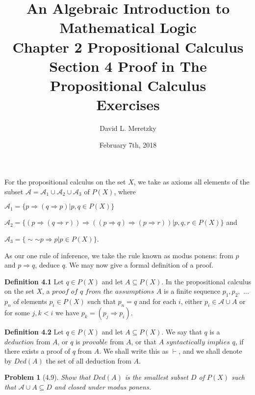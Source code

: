 \documentclass{article}
\title{ \vspace{-10ex} %
An Algebraic Introduction to Mathematical Logic\\
Chapter 2 Propositional Calculus \\
Section 4 Proof in The Propositional Calculus \\
Exercises 
}
\author{David L. Meretzky
}
\date{%
February 7th, 2018
}
\theoremstyle{problemstyle}
\newtheorem{problem}{Problem}
\begin{document}
\maketitle

\begin{flushleft}
For the propositional calculus on the set $X$, we take as axioms all elements of the subset $\mathscr{A} = \mathscr{A}_1 \cup \mathscr{A}_2 \cup \mathscr{A}_3$ 
of $P(X)$, where 
\end{flushleft}

\begin{flushleft}
$\mathscr{A}_1 = \{p \Rightarrow (q \Rightarrow p)|p,q \in P(X) \}$ 

$\mathscr{A}_2 = \{(p \Rightarrow (q \Rightarrow r)) \Rightarrow ((p \Rightarrow q)\Rightarrow (p \Rightarrow r))|p,q,r \in P(X) \}$ and 

$\mathscr{A}_3 = \{\sim$$\sim$$p\Rightarrow p|p \in P(X) \}$.
\end{flushleft}

\begin{flushleft}
As our one rule of inference, we take the rule known as modus ponens: from $p$ and $p\Rightarrow q$, deduce $q$. We may now give a formal definition of a proof. 
\end{flushleft}

\begin{flushleft}
\textbf{Definition 4.1}
Let $q \in P(X)$ and let $A \subseteq P(X)$. In the propositional calculus on the set $X$, a $\textit{proof of q from the assumptions A}$ is a finite sequence $p_1, p_2,$ ... $p_n$ of elements $p_i \in P(X)$ such that $p_n = q$ and for each $i$, either $p_i \in \mathscr{A} \cup A$ or for some $j,k < i$ we have $p_k = (p_j \Rightarrow p_i)$.
\end{flushleft}
\begin{flushleft}
\textbf{Definition 4.2}
Let $q \in P(X)$ and let $A \subseteq P(X)$. We say that $q$ is a $\textit{deduction}$ from $A$, or $q$ is $provable$ from $A$, or that $A$ $syntactically$ $implies$ $q$, if there exists a proof of $q$ from $A$. We shall write this as $\vdash$, and we shall denote by $Ded(A)$ the set of all deduction from $A$.  
\end{flushleft}

\begin{problem}[4.9] 
Show that $Ded(A)$ is the smallest subset $D$ of $P(X)$ such that $\mathscr{A} \cup A \subseteq D$ and closed under modus ponens. 
\end{problem}
\end{document}
